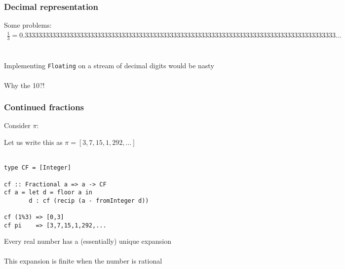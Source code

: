 \documentclass[11pt,aspectratio=169]{beamer}
\begin{document}
\begin{frame}
\frametitle{Decimal representation}
Some problems:
\begin{align*}
\frac{1}{3} = 0.333333333333333333333333333333333333333333333333333333333333333333333333333333333333333333\dots
\end{align*}
\\~\\
Implementing \texttt{Floating} on a stream of decimal digits
would be nasty
\\~\\
Why the 10?!
\end{frame}

\begin{frame}
\frametitle{Continued fractions}
Consider $\pi$:
\end{frame}

\begin{frame}[fragile]
Let us write this as $\pi = [3,7,15,1,292,\dots]$
\\~\\
\begin{verbatim}
type CF = [Integer]

cf :: Fractional a => a -> CF
cf a = let d = floor a in
       d : cf (recip (a - fromInteger d))

cf (1%3) => [0,3]
cf pi    => [3,7,15,1,292,...
\end{verbatim}
Every real number has a (essentially) unique expansion
\\~\\
This expansion is finite when the number is rational
\end{frame}
\end{document}
